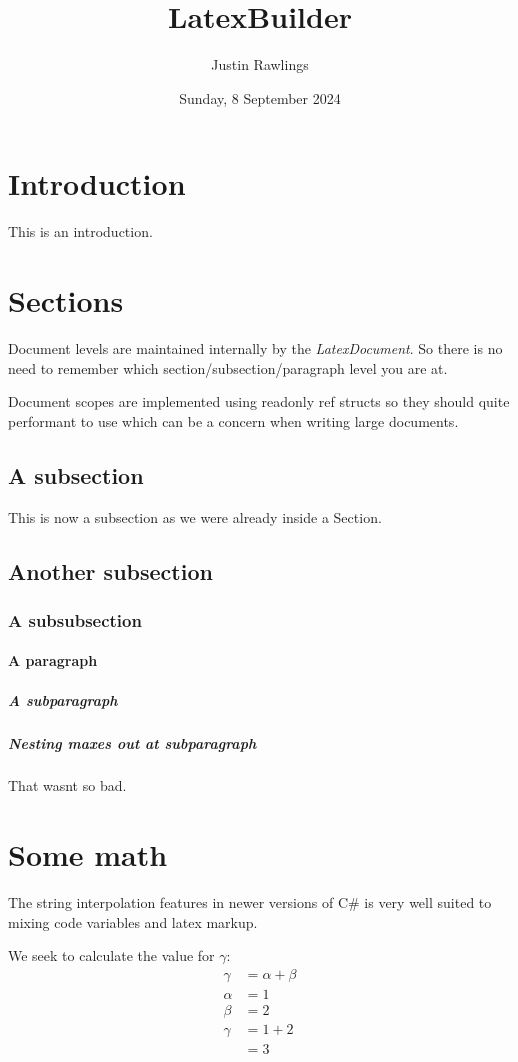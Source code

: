 \documentclass{article}
\title{LatexBuilder}
\author{Justin Rawlings}
\date{Sunday, 8 September 2024}
\begin{document}
\maketitle

\section{Introduction}
This is an introduction.
\section{Sections}
Document levels are maintained internally by the \emph{LatexDocument}.
So there is no need to remember which section/subsection/paragraph level
you are at.

Document scopes are implemented using readonly ref structs so they should
quite performant to use which can be a concern when writing large documents.

\subsection{A subsection}
This is now a subsection as we were already inside a Section.
\subsection{Another subsection}
\subsubsection{A subsubsection}
\paragraph{A paragraph}
\subparagraph{A subparagraph}
\subparagraph{Nesting maxes out at subparagraph}
That wasnt so bad.
\section{Some math}
The string interpolation features in newer versions of C\# is
very well suited to mixing code variables and latex markup.

We seek to calculate the value for $\gamma$:
\begin{align*}
    \gamma & = \alpha + \beta \tag{a tag} \\
    \alpha & = 1                          \\
    \beta  & = 2                          \\
    \gamma & = 1 + 2                      \\
           & = 3
\end{align*}
\end{document}

